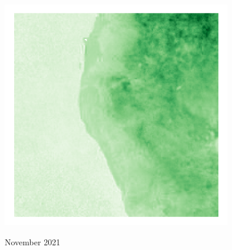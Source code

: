 \documentclass{physics_article_B}
\begin{document}
\begin{titlepage}
	\vspace{0.5\baselineskip} %
	
	
	\vspace{0.8cm}
	\centering
	\includegraphics[width = 100mm]{ndvi_av_jan.png}
	
	
	
	
	
	
	
	
	\vspace{1cm}
	
	November 2021

\end{titlepage}


\tableofcontents


\newpage

\begin{abstract}

\end{abstract}
\end{document}
